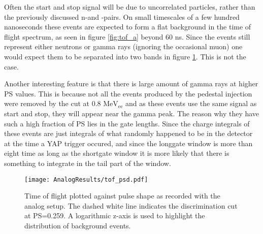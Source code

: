 \documentclass[main.tex]{subfiles}
\begin{document}
Often the start and stop signal will be due to uncorrelated particles, rather than the previously discussed n-\textgamma and \textgamma-\textgamma pairs. On small timescales of a few hundred nanoseconds these events are expected to form a flat background in the time of flight spectrum, as seen in figure \ref{fig:tof_a} beyond 60 ns. Since the events still represent either neutrons or gamma rays (ignoring the occasional muon) one would expect them to be separated into two bands in figure \ref{fig:tof_ps_a}. This is not the case.

Another interesting feature is that there is large amount of gamma rays at higher PS values. This is because not all the events produced by the pedestal injection were removed by the cut at 0.8 $\text{MeV}_\text{ee}$ and as these events use the same signal as start and stop, they will appear near the gamma peak. The reason why they have such a high fraction of PS lies in the gate lengths. Since the charge integrals of these events are just integrals of what randomly happened to be in the detector at the time a YAP trigger occured, and since the longgate window is more than eight time as long as the shortgate window it is more likely that there is something to integrate in the tail part of the window.






\begin{figure}[ht]
    \centering
        \texttt{[image: AnalogResults/tof\_psd.pdf]}
        \caption{Time of flight plotted against pulse shape as recorded with the analog setup. The dashed white line indicates the discrimination cut at PS=0.259. A logarithmic z-axis is used to highlight the distribution of background events.}
    \label{fig:tof_ps_a} 
\end{figure}
\end{document}
